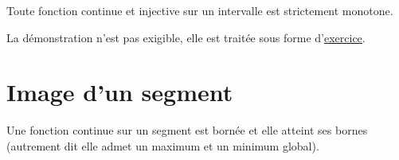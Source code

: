 \begin{thm}
  Toute fonction continue et injective sur un intervalle est strictement monotone.
\end{thm}
\begin{demo}
La démonstration n'est pas exigible, elle est traitée sous forme d'\href{http://back.maquisdoc.net/v-1/index.php?act=chelt&id_elt=5207}{exercice}.  
\end{demo}

\section{Image d'un segment}
\begin{thm}
 Une fonction continue sur un segment est bornée et elle atteint ses bornes (autrement dit elle admet un maximum et un minimum global).
\end{thm}
